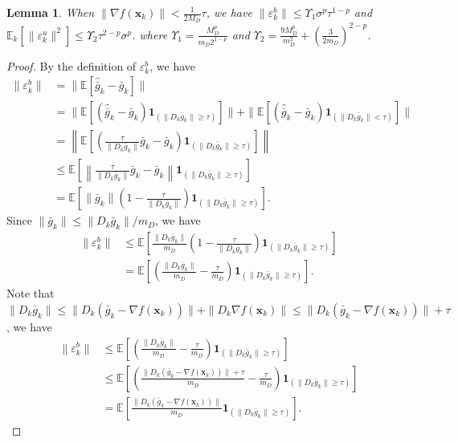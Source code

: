 \documentclass{article}
\newcommand{\bx}{\boldsymbol{x}}
\newcommand{\barg}{\bar{g}}
\theoremstyle{plain}
\newtheorem{lemma}[theorem]{Lemma}
\theoremstyle{definition}
\theoremstyle{remark}
\begin{document}
\begin{lemma}
    When $\|\nabla f(\bx_k)\|<\frac{1}{2M_D}\tau$, we have $\| \varepsilon_k^b\|\leq \Upsilon_1\sigma^{p}\tau^{1-p}$ and $\mathbb{E}_k[ \| \varepsilon_k^u\|^2]\leq \Upsilon_2\tau^{2-p}\sigma^p$.
    where $\Upsilon_1=\frac{M_D^p}{m_D2^{1-p}}$ and $\Upsilon_2=\frac{9 M_D^p}{m_D^2} + \left(\frac{3}{2m_D}\right)^{2-p}$.
\end{lemma}
\begin{proof}
By the definition of $\varepsilon_k^b$, we have
\begin{align*}
\|\varepsilon_k^b\| & = \|\mathbb{E}[\widehat{\barg}_k-\barg_k]\|\\
& = \|\mathbb{E}[(\widehat{\barg}_k-\barg_k)\boldsymbol{1}_{(\|D_k\barg_k\|\geq \tau)}]\| + \|\mathbb{E}[(\widehat{\barg}_k-\barg_k)\boldsymbol{1}_{(\|D_k\barg_k\|< \tau)}]\| \\
& = \left\|\mathbb{E}\left[\left(\frac{\tau}{\|D_k\barg_k\|}\barg_k-\barg_k\right)\boldsymbol{1}_{(\|D_k\barg_k\|\geq \tau)}\right]\right\| \\
& \leq \mathbb{E}\left[\left\|\frac{\tau}{\|D_k\barg_k\|}\barg_k-\barg_k\right\|\boldsymbol{1}_{(\|D_k\barg_k\|\geq \tau)}\right] \\
& = \mathbb{E}\left[\|\barg_k\| \left(1- \frac{\tau}{\|D_k\barg_k\|}\right)\boldsymbol{1}_{(\|D_k\barg_k\|\geq \tau)}\right].
\end{align*}
Since $\|\barg_k\|\leq \|D_k\barg_k\|/m_D$, we have
\begin{align*}
    \|\varepsilon_k^b\| & \leq  \mathbb{E}\left[\frac{\|D_k\barg_k\|}{m_D} \left(1- \frac{\tau}{\|D_k\barg_k\|}\right)\boldsymbol{1}_{(\|D_k\barg_k\|\geq \tau)}\right] \\
    & = \mathbb{E}\left[\left(\frac{\|D_k\barg_k\|}{m_D} - \frac{\tau}{m_D}\right)\boldsymbol{1}_{(\|D_k\barg_k\|\geq \tau)}\right].
\end{align*}
Note that $\|D_k\barg_k\|\leq \|D_k(\barg_k-\nabla f(\bx_k))\|+ \|D_k\nabla f(\bx_k)\|\leq \|D_k(\barg_k-\nabla f(\bx_k))\|+ \tau$, we have
\begin{align*}
    \|\varepsilon_k^b\| & \leq  \mathbb{E}\left[\left(\frac{\|D_k\barg_k\|}{m_D} - \frac{\tau}{m_D}\right)\boldsymbol{1}_{(\|D_k\barg_k\|\geq \tau)}\right] \\
    & \leq \mathbb{E}\left[\left(\frac{\|D_k(\barg_k-\nabla f(\bx_k))\|+ \tau}{m_D} - \frac{\tau}{m_D}\right)\boldsymbol{1}_{(\|D_k\barg_k\|\geq \tau)}\right] \\
    & = \mathbb{E}\left[\frac{\|D_k(\barg_k-\nabla f(\bx_k))\|}{m_D}\boldsymbol{1}_{(\|D_k\barg_k\|\geq \tau)}\right].

\end{align*}
\end{proof}
\end{document}
